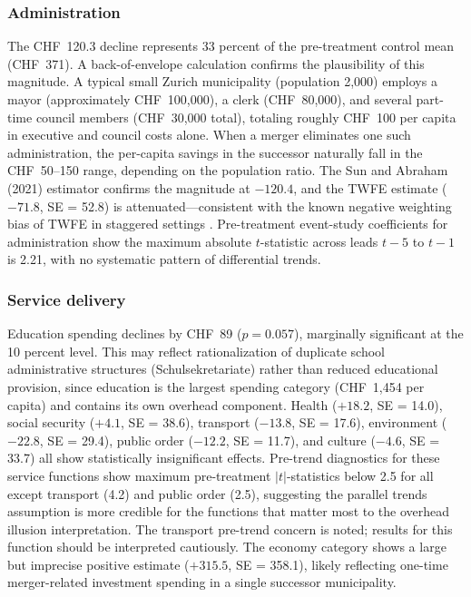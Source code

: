 \documentclass[12pt]{article}
\begin{document}
\subsubsection*{Administration} The CHF~120.3 decline represents 33 percent of the pre-treatment control mean (CHF~371). A back-of-envelope calculation confirms the plausibility of this magnitude. A typical small Zurich municipality (population 2,000) employs a mayor (approximately CHF~100,000), a clerk (CHF~80,000), and several part-time council members (CHF~30,000 total), totaling roughly CHF~100 per capita in executive and council costs alone. When a merger eliminates one such administration, the per-capita savings in the successor naturally fall in the CHF~50--150 range, depending on the population ratio. The Sun and Abraham (2021) estimator confirms the magnitude at $-120.4$, and the TWFE estimate ($-71.8$, SE = 52.8) is attenuated---consistent with the known negative weighting bias of TWFE in staggered settings \citep{goodman-bacon2021}. Pre-treatment event-study coefficients for administration show the maximum absolute $t$-statistic across leads $t-5$ to $t-1$ is 2.21, with no systematic pattern of differential trends.

\subsubsection*{Service delivery} Education spending declines by CHF~89 ($p = 0.057$), marginally significant at the 10 percent level. This may reflect rationalization of duplicate school administrative structures (Schulsekretariate) rather than reduced educational provision, since education is the largest spending category (CHF~1,454 per capita) and contains its own overhead component. Health ($+18.2$, SE = 14.0), social security ($+4.1$, SE = 38.6), transport ($-13.8$, SE = 17.6), environment ($-22.8$, SE = 29.4), public order ($-12.2$, SE = 11.7), and culture ($-4.6$, SE = 33.7) all show statistically insignificant effects. Pre-trend diagnostics for these service functions show maximum pre-treatment $|t|$-statistics below 2.5 for all except transport (4.2) and public order (2.5), suggesting the parallel trends assumption is more credible for the functions that matter most to the overhead illusion interpretation. The transport pre-trend concern is noted; results for this function should be interpreted cautiously. The economy category shows a large but imprecise positive estimate ($+315.5$, SE = 358.1), likely reflecting one-time merger-related investment spending in a single successor municipality.
\end{document}
